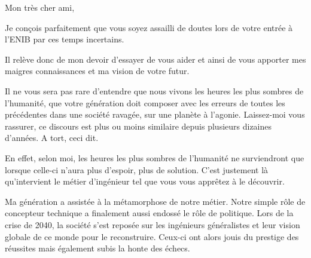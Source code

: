 {%
%


Mon très cher ami,

Je conçois parfaitement que vous soyez assailli de doutes lors de votre entrée à l'ENIB par ces temps incertains.

Il relève donc de mon devoir d'essayer de vous aider et ainsi de vous apporter mes maigres connaissances et ma vision de votre futur.

Il ne vous sera pas rare d'entendre que nous vivons les heures les plus sombres de l'humanité, que votre génération doit composer avec les erreurs de
toutes les précédentes dans une société ravagée, sur une planète à l'agonie.
Laissez-moi vous rassurer, ce discours est plus ou moins similaire depuis plusieurs dizaines d'années. A tort, ceci dit.

En effet, selon moi, les heures les plus sombres de l'humanité ne surviendront que lorsque celle-ci n'aura plus d'espoir, plus de solution.
C'est justement là qu'intervient le métier d'ingénieur tel que vous vous apprêtez à le découvrir.

Ma génération a assistée à la métamorphose de notre métier. Notre simple rôle de concepteur technique a finalement aussi endossé le rôle de politique.
Lors de la crise de 2040, la société s'est reposée sur les ingénieurs généralistes et leur vision globale de ce monde pour le reconstruire.
Ceux-ci ont alors jouis du prestige des réussites mais également subis la honte des échecs.

}
